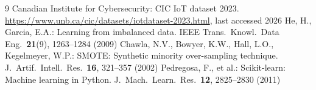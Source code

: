 \documentclass[runningheads]{llncs}
\begin{document}
\begin{thebibliography}{9}
 Canadian Institute for Cybersecurity: CIC IoT dataset 2023. \url{https://www.unb.ca/cic/datasets/iotdataset-2023.html}, last accessed 2026
 He, H., Garcia, E.A.: Learning from imbalanced data. IEEE Trans.\ Knowl.\ Data Eng.\ \textbf{21}(9), 1263--1284 (2009)
 Chawla, N.V., Bowyer, K.W., Hall, L.O., Kegelmeyer, W.P.: SMOTE: Synthetic minority over-sampling technique. J.\ Artif.\ Intell.\ Res.\ \textbf{16}, 321--357 (2002)
 Pedregosa, F., et al.: Scikit-learn: Machine learning in Python. J.\ Mach.\ Learn.\ Res.\ \textbf{12}, 2825--2830 (2011)
\end{thebibliography}
\end{document}
